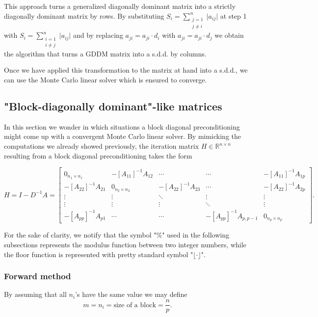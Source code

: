 \documentclass[a4paper,10pt]{article}
\begin{document}
This approach turns a generalized diagonally dominant matrix into a 
strictly diagonally dominant matrix by rows. By substituting 
$\displaystyle S_{i}=\sum^{n}_{\substack{j=1 \\ j\ne i}}\lvert a_{ij}\rvert$ 
at step 1 with 
$\displaystyle S_{i}=\sum^{n}_{\substack{i=1 \\ i\ne j}}\lvert a_{ij}\rvert$ 
and by replacing 
$a_{ji}=a_{ji}\cdot d_i$ with $a_{ji}=a_{ji}\cdot d_j$ we obtain the algorithm 
that turns a GDDM matrix into a s.d.d. by columns.\newline

Once we have applied this transformation to the matrix at hand into a s.d.d., 
we can use the Monte Carlo linear solver which is ensured to converge. 


 \subsection{"Block-diagonally dominant"-like matrices}
 In this section we wonder in which situations a block diagonal preconditioning 
might come up with a convergent Monte Carlo linear solver. 
By mimicking the computations we already showed previously, the iteration 
matrix $H\in\mathbb{R}^{n\times n}$ resulting from a block diagonal 
preconditioning takes the form  

\[
 H=I-D^{-1}A=\begin{bmatrix}0_{n_1\times n_1} & -[A_{11}]^{-1}A_{12} & \cdots &
\cdots & -[A_{11}]^{-1}A_{1p} \\
-[A_{22}]^{-1}A_{21} & 0_{n_2\times n_2} & -[A_{22}]^{-1}A_{23} & 
\cdots & -[A_{22}]^{-1}A_{2p}\\
\vdots & \vdots & \ddots & \vdots & \vdots\\
\vdots & \vdots & \vdots &\ddots & \vdots \\
-[A_{pp}]^{-1}A_{p1} &  \cdots & \cdots& 
-[A_{pp}]^{-1}A_{p,p-1} & 0_{n_p \times n_p}
\end{bmatrix}.
\] 

For the sake of clarity, we notify that the symbol "$\%$" used in the following 
subsections represents the modulus function between two integer numbers, while 
the floor function is represented with pretty standard symbol "$\lfloor 
\cdot \rfloor$".

\subsubsection*{Forward method}
By assuming that all $n_i$'s have the same value we may define
\[
 m=n_i=\text{size of a block}=\frac{n}{p}.
\]
\end{document}

